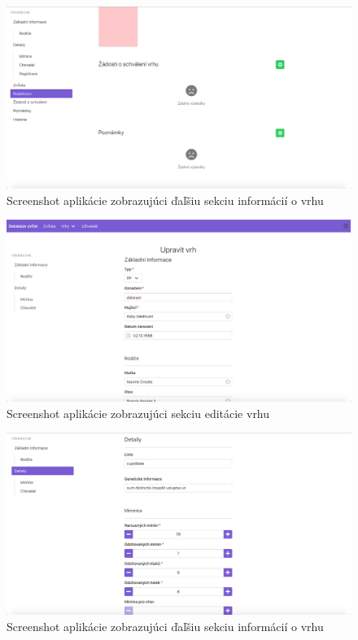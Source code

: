 \vspace*{\fill}

\begin{figure}[H]
	\includegraphics[width=1.0\textwidth]{media/priloha/vrh/5.png}
	\caption{Screenshot aplikácie zobrazujúci ďaľšiu sekciu informácií o vrhu}
\end{figure}

\begin{figure}[H]
	\includegraphics[width=1.0\textwidth]{media/priloha/vrh/editacia/1.png}
	\caption{Screenshot aplikácie zobrazujúci sekciu editácie vrhu}
\end{figure}

\vspace*{\fill}

\begin{figure}[H]
	\includegraphics[width=1.0\textwidth]{media/priloha/vrh/editacia/2.png}
	\caption{Screenshot aplikácie zobrazujúci ďaľšiu sekciu informácií o vrhu}
\end{figure}

